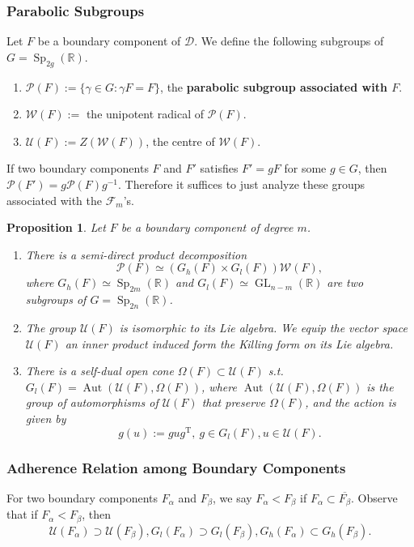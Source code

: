 \documentclass[11pt,english]{smfart}
\newtheorem{proposition}{Proposition}[section]
\theoremstyle{definition}
\theoremstyle{remark}
\newcommand{\R}{\mathbb{R}}
\DeclareMathOperator{\GL}{GL}
\DeclareMathOperator{\Sp}{Sp}
\DeclareMathOperator{\aut}{Aut} %
\newcommand{\tran}[1]{{#1}^{\mathrm{T}}} %
\newcommand{\myit}{$\diamond$}
\renewcommand{\bar}{\overline}
\begin{document}
\subsubsection{Parabolic Subgroups}
Let $F$ be a boundary component of $\mathcal{D}$.
We define the following subgroups of $G = \Sp_{2g}(\R{})$.
\begin{enumerate}
    \item[\myit] $\mathcal{P}(F) := \{\gamma\in G:\gamma F = F\}$, the \textbf{parabolic subgroup associated with $F$}.
    \item[\myit] $\mathcal{W}(F) :=$ the unipotent radical of $\mathcal{P}(F)$.
    \item[\myit] $\mathcal{U}(F) := Z(\mathcal{W}(F))$, the centre of $\mathcal{W}(F)$.
\end{enumerate}
If two boundary components $F$ and $F'$ satisfies $F'=gF$ for some $g\in G$, then $\mathcal{P}(F') = g\mathcal{P}(F)g^{-1}$.
Therefore it suffices to just analyze these groups associated with the $\mathcal{F}_m$'s. 
\begin{proposition}
    Let $F$ be a boundary component of degree $m$.\begin{enumerate}
        \item [(1)] There is a semi-direct product decomposition \[\mathcal{P}(F)\simeq (G_h(F)\times G_l(F))\mathcal{W}(F),\]
        where $G_h(F)\simeq \Sp_{2m}(\R)$ and $G_l(F)\simeq \GL_{n-m}(\R)$ are two subgroups of $G=\Sp_{2n}(\R)$.
        \item [(2)] The group $\mathcal{U}(F)$ is isomorphic to its Lie algebra. We equip the vector space $\mathcal{U}(F)$ an inner product induced form the Killing form on its Lie algebra.
        \item [(3)] There is a self-dual open cone $\Omega(F)\subset\mathcal{U}(F)$ s.t. $G_l(F) = \aut(\mathcal{U}(F), \Omega(F))$, where $\aut(\mathcal{U}(F), \Omega(F))$ is the group of automorphisms of $\mathcal{U}(F)$ that preserve $\Omega(F)$, and the action is given by \[g(u) := gu\tran{g},\ g\in G_l(F), u\in\mathcal{U}(F).\]
    \end{enumerate}
\end{proposition}


\subsubsection{Adherence Relation among Boundary Components}
For two boundary components $F_\alpha$ and $F_\beta$, we say $F_\alpha < F_\beta$ if $F_\alpha\subset\bar{F_\beta}$.
Observe that if $F_\alpha < F_\beta$, then \[\mathcal{U}(F_\alpha)\supset\mathcal{U}(F_\beta), G_l(F_\alpha)\supset G_l(F_\beta), G_h(F_\alpha)\subset G_h(F_\beta).\]
\end{document}
